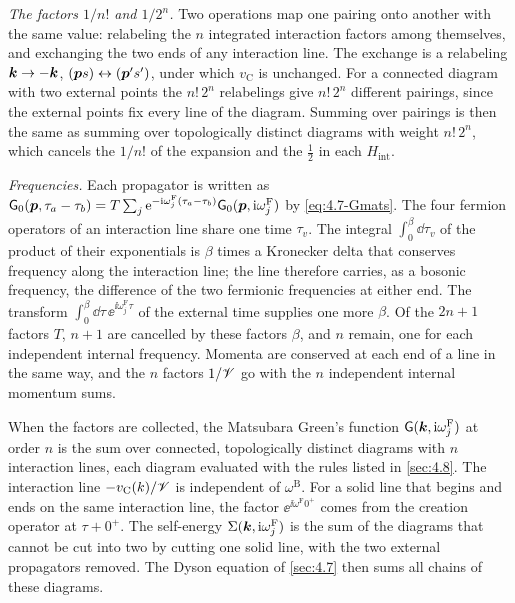 \emph{The factors $1/n!$ and $1/2^n$.} Two operations map one pairing onto another with the same value: relabeling the $n$ integrated interaction factors among themselves, and exchanging the two ends of any interaction line. The exchange is a relabeling $\bm{k} \to -\bm{k}$, $(\bm{p}s) \leftrightarrow (\bm{p}'s')$, under which $v_{\mathrm{C}}$ is unchanged. For a connected diagram with two external points the $n!\,2^n$ relabelings give $n!\,2^n$ different pairings, since the external points fix every line of the diagram. Summing over pairings is then the same as summing over topologically distinct diagrams with weight $n!\,2^n$, which cancels the $1/n!$ of the expansion and the $\tfrac12$ in each $H_{\mathrm{int}}$.

\emph{Frequencies.} Each propagator is written as $\mathsf{G}_0(\bm{p},\tau_a - \tau_b) = T\sum_j\mathrm{e}^{-\mathrm{i}\omega^{\mathrm{F}}_j(\tau_a - \tau_b)}\mathsf{G}_0(\bm{p},\mathrm{i}\omega^{\mathrm{F}}_j)$ by \cref{eq:4.7-Gmats}. The four fermion operators of an interaction line share one time $\tau_v$. The integral $\int_0^\beta\dd\tau_v$ of the product of their exponentials is $\beta$ times a Kronecker delta that conserves frequency along the interaction line; the line therefore carries, as a bosonic frequency, the difference of the two fermionic frequencies at either end. The transform $\int_0^\beta\dd\tau\,\ee^{\ii\omega^{\mathrm{F}}_j\tau}$ of the external time supplies one more $\beta$. Of the $2n + 1$ factors $T$, $n + 1$ are cancelled by these factors $\beta$, and $n$ remain, one for each independent internal frequency. Momenta are conserved at each end of a line in the same way, and the $n$ factors $1/\mathscr{V}$ go with the $n$ independent internal momentum sums.

When the factors are collected, the Matsubara Green's function $\mathsf{G}(\bm{k},\mathrm{i}\omega^{\mathrm{F}}_j)$ at order $n$ is the sum over connected, topologically distinct diagrams with $n$ interaction lines, each diagram evaluated with the rules listed in \cref{sec:4.8}. The interaction line $-v_{\mathrm{C}}(k)/\mathscr{V}$ is independent of $\omega^{\mathrm{B}}$. For a solid line that begins and ends on the same interaction line, the factor $\ee^{\ii\omega^{\mathrm{F}}0^+}$ comes from the creation operator at $\tau + 0^+$.
The self-energy $\Sigma(\bm{k},\mathrm{i}\omega^{\mathrm{F}}_j)$ is the sum of the diagrams that cannot be cut into two by cutting one solid line, with the two external propagators removed. The Dyson equation of \cref{sec:4.7} then sums all chains of these diagrams.

